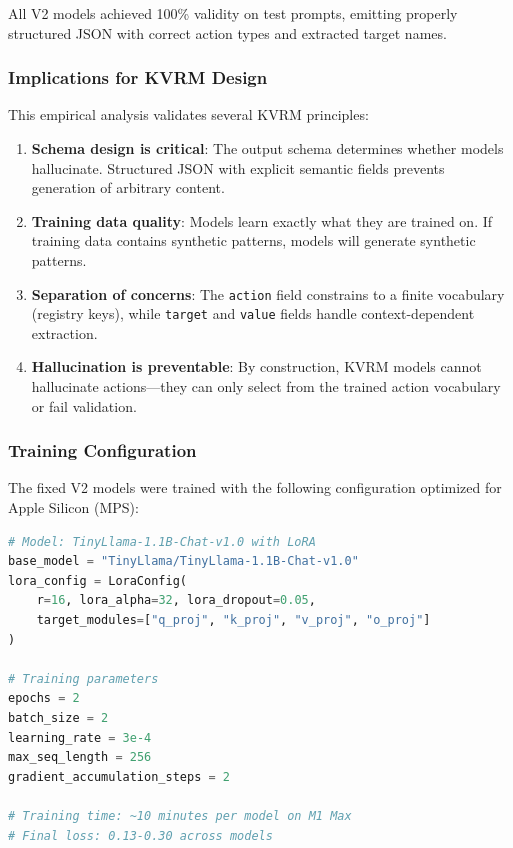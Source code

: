 \documentclass[11pt,a4paper]{article}
\begin{document}
\noindent All V2 models achieved 100\% validity on test prompts, emitting properly structured JSON with correct action types and extracted target names.

\subsubsection{Implications for KVRM Design}

This empirical analysis validates several KVRM principles:

\begin{enumerate}
    \item \textbf{Schema design is critical}: The output schema determines whether models hallucinate. Structured JSON with explicit semantic fields prevents generation of arbitrary content.

    \item \textbf{Training data quality}: Models learn exactly what they are trained on. If training data contains synthetic patterns, models will generate synthetic patterns.

    \item \textbf{Separation of concerns}: The \texttt{action} field constrains to a finite vocabulary (registry keys), while \texttt{target} and \texttt{value} fields handle context-dependent extraction.

    \item \textbf{Hallucination is preventable}: By construction, KVRM models cannot hallucinate actions---they can only select from the trained action vocabulary or fail validation.
\end{enumerate}

\subsubsection{Training Configuration}

The fixed V2 models were trained with the following configuration optimized for Apple Silicon (MPS):

\begin{lstlisting}[language=Python,caption={V2 Training Configuration}]
# Model: TinyLlama-1.1B-Chat-v1.0 with LoRA
base_model = "TinyLlama/TinyLlama-1.1B-Chat-v1.0"
lora_config = LoraConfig(
    r=16, lora_alpha=32, lora_dropout=0.05,
    target_modules=["q_proj", "k_proj", "v_proj", "o_proj"]
)

# Training parameters
epochs = 2
batch_size = 2
learning_rate = 3e-4
max_seq_length = 256
gradient_accumulation_steps = 2

# Training time: ~10 minutes per model on M1 Max
# Final loss: 0.13-0.30 across models
\end{lstlisting}
\end{document}
